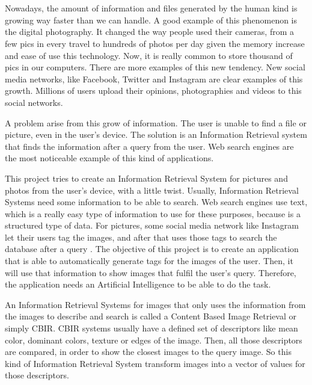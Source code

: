 \\

\vspace{0.7cm}
\\

Nowadays, the amount of information and files generated by the human kind is growing way faster than we can handle. A good example of this phenomenon is the digital photography. It changed the way people used their cameras, from a few pics in every travel to hundreds of photos per day given the memory increase and ease of use this technology. Now, it is really common to store thousand of pics in our computers.  There are more examples of this new tendency.  New social media networks, like Facebook, Twitter and Instagram are clear examples of this growth. Millions of users upload their opinions, photographies and videos to this social networks. 

A problem arise from this grow of information. The user is unable to find a file or picture, even in the user’s device. The solution is an Information Retrieval system  that finds the information after a query from the user. Web search engines are the most noticeable example of this kind of applications.

This project tries to create an Information Retrieval System for pictures and photos from the user’s device, with a little twist. Usually, Information Retrieval Systems need some information to be able to search. Web search engines use text, which is a really easy type of information to use for these purposes, because is a structured type of data. For pictures, some social media network like Instagram let their users tag the images, and after that uses those tags to search the database after a query . The objective of this project is to create an application that is able to automatically generate tags for the images of the user. Then, it will use that information to show images that fulfil the user’s query. Therefore, the application needs an Artificial Intelligence to be able to do the task. 

An Information Retrieval Systems for images that only uses the information from the images to describe and search is called a Content Based Image Retrieval or simply CBIR. CBIR systems usually have a defined set of descriptors like mean color, dominant colors, texture or edges of the image. Then, all those descriptors are compared, in order to show the closest images to the query image. So this kind of Information Retrieval System transform images into a vector of values for those descriptors.

